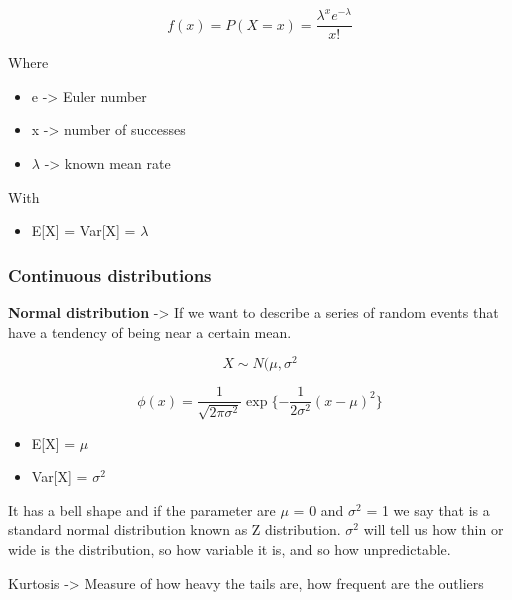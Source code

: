 \begin{equation}
    f(x) = P(X=x) = \frac{\lambda^xe^{-\lambda}}{x!}
\end{equation}

Where

\begin{itemize}
    \item e -> Euler number
    \item x -> number of successes
    \item $\lambda $ -> known mean rate
\end{itemize}

With
\begin{itemize}
    \item E[X] = Var[X] = $\lambda$
\end{itemize}


\subsubsection{Continuous distributions}

\vspace{10pt}


\textbf{Normal distribution} -> If we want to describe a series of random events that have a tendency of being near a certain mean.

\begin{equation}
    X \sim N(\mu, \sigma^2
\end{equation}

\begin{equation}
    \phi (x) = \frac{1}{\sqrt{2\pi\sigma^2}} \exp{\{-\frac{1}{2\sigma^2} (x-\mu)^2\}}
\end{equation}

\begin{itemize}
    \item E[X] = $\mu$
    \item Var[X] = $\sigma^2$
\end{itemize}

It has a bell shape and if the parameter are $\mu$ = 0 and $\sigma^2$ = 1 we say that is a standard normal distribution known as Z distribution. $\sigma^2$ will tell us how thin or wide is the distribution, so how variable it is, and so how unpredictable. 

Kurtosis -> Measure of how heavy the tails are, how frequent are the outliers

\vspace{10pt}

\vspace{10pt}

